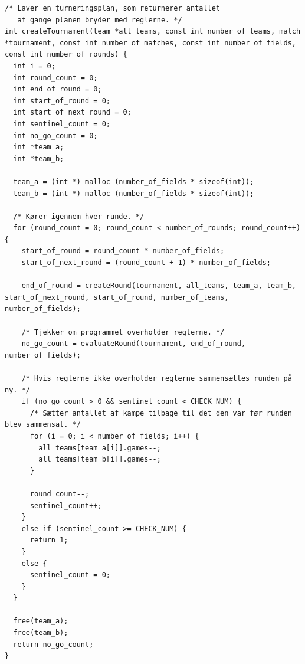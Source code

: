 \begin{listing}[H]
\begin{verbatim} 
/* Laver en turneringsplan, som returnerer antallet 
   af gange planen bryder med reglerne. */
int createTournament(team *all_teams, const int number_of_teams, match *tournament, const int number_of_matches, const int number_of_fields, const int number_of_rounds) {
  int i = 0;
  int round_count = 0;
  int end_of_round = 0;
  int start_of_round = 0;
  int start_of_next_round = 0;
  int sentinel_count = 0;
  int no_go_count = 0;
  int *team_a;
  int *team_b;

  team_a = (int *) malloc (number_of_fields * sizeof(int));
  team_b = (int *) malloc (number_of_fields * sizeof(int));

  /* Kører igennem hver runde. */
  for (round_count = 0; round_count < number_of_rounds; round_count++) {
    start_of_round = round_count * number_of_fields;
    start_of_next_round = (round_count + 1) * number_of_fields;

    end_of_round = createRound(tournament, all_teams, team_a, team_b, start_of_next_round, start_of_round, number_of_teams, number_of_fields);

    /* Tjekker om programmet overholder reglerne. */
    no_go_count = evaluateRound(tournament, end_of_round, number_of_fields);

    /* Hvis reglerne ikke overholder reglerne sammensættes runden på ny. */
    if (no_go_count > 0 && sentinel_count < CHECK_NUM) {
      /* Sætter antallet af kampe tilbage til det den var før runden blev sammensat. */
      for (i = 0; i < number_of_fields; i++) {
        all_teams[team_a[i]].games--;
        all_teams[team_b[i]].games--;
      }

      round_count--;
      sentinel_count++;
    }
    else if (sentinel_count >= CHECK_NUM) {
      return 1;
    }
    else {
      sentinel_count = 0;
    }
  }

  free(team_a);
  free(team_b);
  return no_go_count;
}
\end{verbatim}
\label{code:createTournament}
\end{listing}

